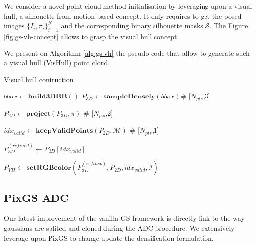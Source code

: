 We consider a novel point cloud method initialisation by leveraging upon a visual hull, a silhouette-from-motion based-concept. It only requires to get the posed images $\{I_{i},\pi_{i}\}_{i=1}^{N}$ and the corresponding binary silhouette masks $\mathcal{S}$. The Figure \ref{fig:gs-vh-concept} allows to grasp the visual hull concept. 

We present on Algorithm \ref{alg:gs-vh} the pseudo code that allow to generate such a visual hull (VisHull) point cloud. 

\begin{algorithm}[htpb!]
  \caption{Visual hull contruction}\label{alg:gs-vh}
  \medskip
  \medskip
  $bbox \gets \mathbf{build3DBB}()$ 
  $P_{3D} \gets \mathbf{sampleDensely}(bbox)$\hspace{.4cm}\textcolor{gray!80}{\# 
    [$N_{pts}$,3]} 

   $P_{2D} \gets \mathbf{project}(P_{3D},\pi)$ \hspace{.4cm}\textcolor{gray!80}{\# 
    [$N_{pts}$,2]} 
    
    $idx_{valid} \gets \mathbf{keepValidPoints}(P_{2D},\mathcal{M})$ \hspace{.4cm}\textcolor{gray!80}{\# 
    [$N_{pts}$,1]} 

    $P_{3D}^{(refined)} \gets P_{3D}[idx_{valid}]$ 

    $P_{VH} \gets \mathbf{setRGBcolor}(P_{3D}^{(refined)},P_{2D},idx_{valid},\mathcal{I})$ 
\end{algorithm}

\newpage

\subsection{PixGS ADC}
\label{gs:pixgs-adc}
Our latest improvement of the vanilla GS framework is directly link to the way gaussians are splited and cloned during the ADC procedure. We extensively leverage upon PixGS \cite{zhang2024pixelgs} to change update the densification formulation.  

